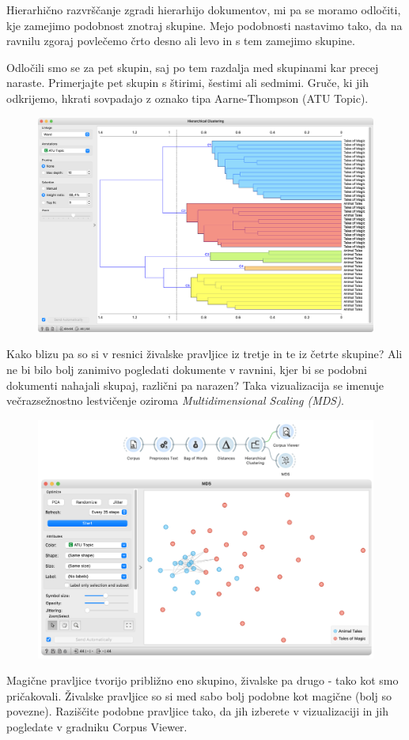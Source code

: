 \newpage

Hierarhično razvrščanje zgradi hierarhijo dokumentov, mi pa se moramo odločiti, kje zamejimo podobnost znotraj skupine. Mejo podobnosti nastavimo tako, da na ravnilu zgoraj povlečemo črto desno ali levo in s tem zamejimo skupine.

Odločili smo se za pet skupin, saj po tem razdalja med skupinami kar precej naraste. Primerjajte pet skupin s štirimi, šestimi ali sedmimi. Gruče, ki jih odkrijemo, hkrati sovpadajo z oznako tipa Aarne-Thompson (ATU Topic).

\begin{figure}[h]
    \includegraphics[width=\linewidth]{hc-clusters.png}%
    \caption{ }
    \label{fig:005-hc-clusters}
\end{figure}

\newpage

Kako blizu pa so si v resnici živalske pravljice iz tretje in te iz četrte skupine? Ali ne bi bilo bolj zanimivo pogledati dokumente v ravnini, kjer bi se podobni dokumenti nahajali skupaj, različni pa narazen? Taka vizualizacija se imenuje večrazsežnostno lestvičenje oziroma \textit{Multidimensional Scaling (MDS)}.

\begin{figure}[h]
    \includegraphics[width=\linewidth]{mds.png}%
    \caption{ }
    \label{fig:005-mds}
\end{figure}

Magične pravljice tvorijo približno eno skupino, živalske pa drugo - tako kot smo pričakovali. Živalske pravljice so si med sabo bolj podobne kot magične (bolj so povezne). Raziščite podobne pravljice tako, da jih izberete v vizualizaciji in jih pogledate v gradniku Corpus Viewer.
